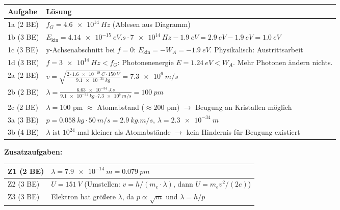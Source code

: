 \documentclass[11pt,a4paper]{article}
\begin{document}
\begin{tabularx}{\textwidth}{|l|X|}
\hline
\rowcolor{physiklight}
\textbf{Aufgabe} & \textbf{Lösung} \\
\hline
1a (2 BE) & $f_G = \SI{4,6e14}{Hz}$ (Ablesen aus Diagramm) \\
\hline
1b (3 BE) & $E_{\text{kin}} = \SI{4,14e-15}{eV.s} \cdot \SI{7e14}{Hz} - \SI{1,9}{eV} = \SI{2,9}{eV} - \SI{1,9}{eV} = \SI{1,0}{eV}$ \\
\hline
1c (3 BE) & y-Achsenabschnitt bei $f=0$: $E_{\text{kin}} = -W_A = -\SI{1,9}{eV}$. Physikalisch: Austrittsarbeit \\
\hline
1d (3 BE) & $f = \SI{3e14}{Hz} < f_G$: Photonenenergie $E = \SI{1,24}{eV} < W_A$. Mehr Photonen ändern nichts. \\
\hline
2a (2 BE) & $v = \sqrt{\frac{2 \cdot \SI{1,6e-19}{C} \cdot \SI{150}{V}}{\SI{9,1e-31}{kg}}} = \SI{7,3e6}{m/s}$ \\
\hline
2b (2 BE) & $\lambda = \frac{\SI{6,63e-34}{J.s}}{\SI{9,1e-31}{kg} \cdot \SI{7,3e6}{m/s}} = \SI{100}{pm}$ \\
\hline
2c (2 BE) & $\lambda = 100$ pm $\approx$ Atomabstand ($\approx 200$ pm) $\rightarrow$ Beugung an Kristallen möglich \\
\hline
3a (3 BE) & $p = \SI{0,058}{kg} \cdot \SI{50}{m/s} = \SI{2,9}{kg.m/s}$, $\lambda = \SI{2,3e-34}{m}$ \\
\hline
3b (4 BE) & $\lambda$ ist $10^{24}$-mal kleiner als Atomabstände $\rightarrow$ kein Hindernis für Beugung existiert \\
\hline
\end{tabularx}

\vspace{0.5em}

\textbf{Zusatzaufgaben:}

\begin{tabularx}{\textwidth}{|l|X|}
\hline
Z1 (2 BE) & $\lambda = \SI{7,9e-14}{m} = \SI{0,079}{pm}$ \\
\hline
Z2 (3 BE) & $U = \SI{151}{V}$ (Umstellen: $v = h/(m_e \cdot \lambda)$, dann $U = m_e v^2 / (2e)$) \\
\hline
Z3 (3 BE) & Elektron hat größere $\lambda$, da $p \propto \sqrt{m}$ und $\lambda = h/p$ \\
\hline
\end{tabularx}

\vspace{0.5em}

\end{document}
